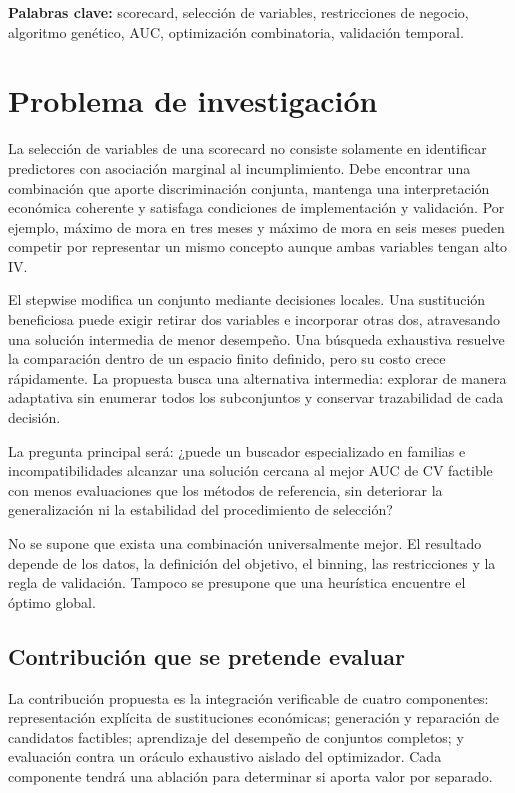 \documentclass[11pt,letterpaper]{article}
\begin{document}
\textbf{Palabras clave:} scorecard, selección de variables, restricciones de negocio, algoritmo genético, AUC, optimización combinatoria, validación temporal.

\section{Problema de investigación}\label{sec:1}

La selección de variables de una scorecard no consiste solamente en identificar predictores con asociación marginal al incumplimiento. Debe encontrar una combinación que aporte discriminación conjunta, mantenga una interpretación económica coherente y satisfaga condiciones de implementación y validación. Por ejemplo, máximo de mora en tres meses y máximo de mora en seis meses pueden competir por representar un mismo concepto aunque ambas variables tengan alto IV.

El stepwise modifica un conjunto mediante decisiones locales. Una sustitución beneficiosa puede exigir retirar dos variables e incorporar otras dos, atravesando una solución intermedia de menor desempeño. Una búsqueda exhaustiva resuelve la comparación dentro de un espacio finito definido, pero su costo crece rápidamente. La propuesta busca una alternativa intermedia: explorar de manera adaptativa sin enumerar todos los subconjuntos y conservar trazabilidad de cada decisión.

La pregunta principal será: ¿puede un buscador especializado en familias e incompatibilidades alcanzar una solución cercana al mejor AUC de CV factible con menos evaluaciones que los métodos de referencia, sin deteriorar la generalización ni la estabilidad del procedimiento de selección?

No se supone que exista una combinación universalmente mejor. El resultado depende de los datos, la definición del objetivo, el binning, las restricciones y la regla de validación. Tampoco se presupone que una heurística encuentre el óptimo global.

\subsection{Contribución que se pretende evaluar}\label{sec:1.1}

La contribución propuesta es la integración verificable de cuatro componentes: representación explícita de sustituciones económicas; generación y reparación de candidatos factibles; aprendizaje del desempeño de conjuntos completos; y evaluación contra un oráculo exhaustivo aislado del optimizador. Cada componente tendrá una ablación para determinar si aporta valor por separado.
\end{document}
